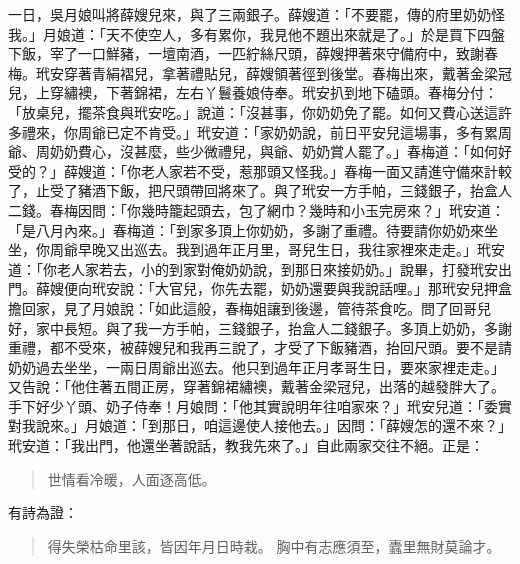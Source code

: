 一日，吳月娘叫將薛嫂兒來，與了三兩銀子。薛嫂道：「不要罷，傳的府里奶奶怪我。」月娘道：「天不使空人，多有累你，我見他不題出來就是了。」於是買下四盤下飯，宰了一口鮮豬，一壇南酒，一匹紵絲尺頭，薛嫂押著來守備府中，致謝春梅。玳安穿著青絹褶兒，拿著禮貼兒，薛嫂領著徑到後堂。春梅出來，戴著金梁冠兒，上穿繡襖，下著錦裙，左右丫鬟養娘侍奉。玳安扒到地下磕頭。春梅分付：「放桌兒，擺茶食與玳安吃。」說道：「沒甚事，你奶奶免了罷。如何又費心送這許多禮來，你周爺已定不肯受。」玳安道：「家奶奶說，前日平安兒這場事，多有累周爺、周奶奶費心，沒甚麼，些少微禮兒，與爺、奶奶賞人罷了。」春梅道：「如何好受的？」薛嫂道：「你老人家若不受，惹那頭又怪我。」春梅一面又請進守備來計較了，止受了豬酒下飯，把尺頭帶回將來了。與了玳安一方手帕，三錢銀子，抬盒人二錢。春梅因問：「你幾時籠起頭去，包了網巾？幾時和小玉完房來？」玳安道：「是八月內來。」春梅道：「到家多頂上你奶奶，多謝了重禮。待要請你奶奶來坐坐，你周爺早晚又出巡去。我到過年正月里，哥兒生日，我往家裡來走走。」玳安道：「你老人家若去，小的到家對俺奶奶說，到那日來接奶奶。」說畢，打發玳安出門。薛嫂便向玳安說：「大官兒，你先去罷，奶奶還要與我說話哩。」那玳安兒押盒擔回家，見了月娘說：「如此這般，春梅姐讓到後邊，管待茶食吃。問了回哥兒好，家中長短。與了我一方手帕，三錢銀子，抬盒人二錢銀子。多頂上奶奶，多謝重禮，都不受來，被薛嫂兒和我再三說了，才受了下飯豬酒，抬回尺頭。要不是請奶奶過去坐坐，一兩日周爺出巡去。他只到過年正月孝哥生日，要來家裡走走。」又告說：「他住著五間正房，穿著錦裙繡襖，戴著金梁冠兒，出落的越發胖大了。手下好少丫頭、奶子侍奉！月娘問：「他其實說明年往咱家來？」玳安兒道：「委實對我說來。」月娘道：「到那日，咱這邊使人接他去。」因問：「薛嫂怎的還不來？」玳安道：「我出門，他還坐著說話，教我先來了。」自此兩家交往不絕。正是：
\begin{quote}
世情看冷暖，人面逐高低。
\end{quote}
有詩為證：
\begin{quote}
得失榮枯命里該，皆因年月日時栽。
胸中有志應須至，蠹里無財莫論才。
\end{quote}
